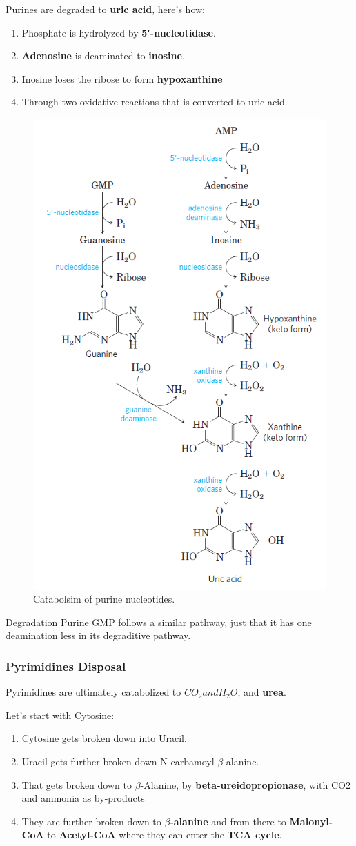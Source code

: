 \documentclass[../main.tex]{subfiles}
\begin{document}
Purines are degraded to \textbf{\gls{uric acid}}, here's how:
\begin{enumerate}
	\item Phosphate is hydrolyzed by \textbf{\gls{5'-nucleotidase}}.
	\item \textbf{\gls{Adenosine}} is deaminated to \textbf{\gls{inosine}}.
	\item Inosine loses the ribose to form \textbf{\gls{hypoxanthine}}
	\item Through two oxidative reactions that is converted to uric acid.
\end{enumerate}

\begin{figure}[H]
	\centering
	\includegraphics[width=0.4\linewidth]{ump_deg}
	\caption{Catabolsim of purine nucleotides.}
	\label{fig:umpdeg}
\end{figure}


\begin{RemarkWithTitel}{Degradation Purine}
	GMP follows a similar pathway, just that it has one deamination less in its degraditive pathway.
\end{RemarkWithTitel}


\subsubsection{Pyrimidines Disposal}

Pyrimidines are ultimately catabolized to $CO_{2} and H_{2}O$, and \textbf{urea}. 

Let's start with Cytosine:
\begin{enumerate}
	\item Cytosine gets broken down into Uracil.
	\item Uracil gets further broken down N-carbamoyl-$\beta$-alanine.
	\item That gets broken down to $\beta$-\gls{Alanine}, by \textbf{\gls{beta-ureidopropionase}}, with CO2 and ammonia as by-products
	\item They are further broken down to \textbf{$\beta$-alanine} and from there to \textbf{Malonyl-CoA} to \textbf{Acetyl-CoA} where they can enter the \textbf{TCA cycle}.
\end{enumerate}
\end{document}
